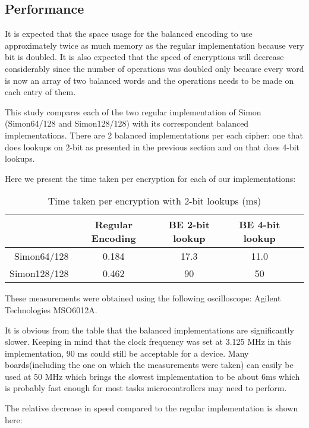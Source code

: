 \documentclass[conference]{IEEEtran}
\begin{document}
\subsection{Performance}

It is expected that the space usage for the balanced encoding to use approximately twice as much memory as the regular implementation because very bit is doubled. It is also expected that the speed of encryptions will decrease considerably since the number of operations was doubled only because every word is now an array of two balanced words and the operations needs to be made on each entry of them. 

This study compares each of the two regular implementation of Simon (Simon64/128 and Simon128/128) with its correspondent balanced implementations. There are 2 balanced implementations per each cipher: one that does lookups on 2-bit as presented in the previous section and on that does 4-bit lookups.

Here we present the time taken per encryption for each of our implementations:

\begin{table}[htbp]
  \renewcommand{\arraystretch}{1.3}
  \caption{Time taken per encryption with 2-bit lookups (ms)}
  \vspace{0.05 in}
  \label{tab:space2}
  \centering
  \begin{tabular}{r|cccp{0.5in}}
    ~ & Regular Encoding  & BE 2-bit lookup & BE 4-bit lookup \\ \hline
    Simon64/128  & 0.184 & 17.3 & 11.0\\
    Simon128/128 & 0.462 & 90 & 50\\
  \end{tabular}
\end{table}

These measurements were obtained using the following oscilloscope: Agilent Technologies MSO6012A.

It is obvious from the table that the balanced implementations are significantly slower. Keeping in mind that the clock frequency was set at 3.125 MHz in this implementation, 90 ms could still be acceptable for a device. Many boards(including the one on which the measurements were taken) can easily be used at 50 MHz which brings the slowest implementation to be about 6ms which is probably fast enough for most tasks microcontrollers may need to perform.

The relative decrease in speed compared to the regular implementation is shown here:
\end{document}
